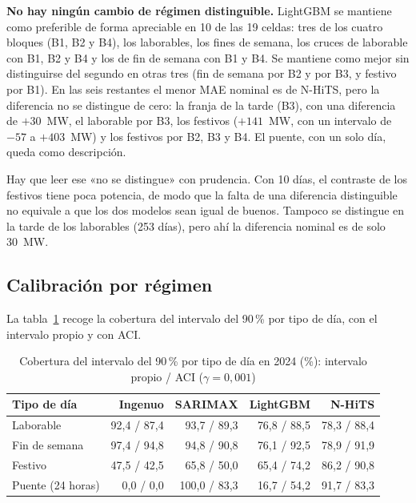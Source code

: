\textbf{No hay ningún cambio de régimen distinguible.} LightGBM se mantiene como
preferible de forma apreciable en 10 de las 19 celdas: tres de los cuatro
bloques (B1, B2 y B4), los laborables, los fines de semana, los cruces de
laborable con B1, B2 y B4 y los de fin de semana con B1 y B4. Se mantiene como
mejor sin distinguirse del segundo en otras tres (fin de semana por B2 y por
B3, y festivo por B1). En las seis restantes el menor MAE nominal es de N-HiTS,
pero la diferencia no se distingue de cero: la franja de la tarde (B3), con una
diferencia de $+30$~MW, el laborable por B3, los festivos ($+141$~MW, con un
intervalo de $-57$ a $+403$~MW) y los festivos por B2, B3 y B4. El puente, con un
solo día, queda como descripción.

Hay que leer ese «no se distingue» con prudencia. Con 10 días, el contraste de
los festivos tiene poca potencia, de modo que la falta de una diferencia
distinguible no equivale a que los dos modelos sean igual de buenos. Tampoco se
distingue en la tarde de los laborables (253 días), pero ahí la diferencia
nominal es de solo 30~MW.

\subsection{Calibración por régimen}\label{sec:desg-cal}

La tabla~\ref{tab:desg-cob} recoge la cobertura del intervalo del 90\,\% por
tipo de día, con el intervalo propio y con ACI.

\begin{table}[htbp]
	\centering
	\caption{Cobertura del intervalo del 90\,\% por tipo de día en 2024 (\%): intervalo propio / ACI ($\gamma = 0{,}001$)}
	\label{tab:desg-cob}
	\small
	\begin{tabular}{lrrrr}
		\hline
		\textbf{Tipo de día} & \textbf{Ingenuo} & \textbf{SARIMAX} & \textbf{LightGBM} & \textbf{N-HiTS} \\
		\hline
		Laborable & 92,4 / 87,4 & 93,7 / 89,3 & 76,8 / 88,5 & 78,3 / 88,4 \\
		Fin de semana & 97,4 / 94,8 & 94,8 / 90,8 & 76,1 / 92,5 & 78,9 / 91,9 \\
		Festivo & 47,5 / 42,5 & 65,8 / 50,0 & 65,4 / 74,2 & 86,2 / 90,8 \\
		Puente (24 horas) & 0,0 / 0,0 & 100,0 / 83,3 & 16,7 / 54,2 & 91,7 / 83,3 \\
		\hline
	\end{tabular}
\end{table}

